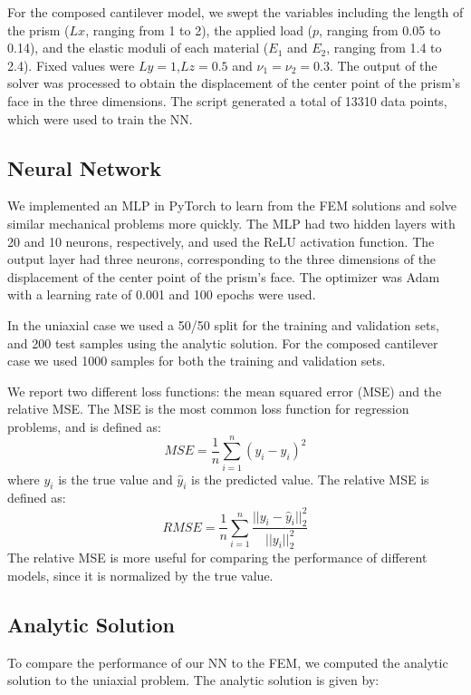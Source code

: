 \documentclass[oneside,a4paper,english,links]{amca}
\begin{document}
For the composed cantilever model, we swept the variables including the length of the prism ($Lx$, ranging from 1 to 2), the applied load ($p$, ranging from 0.05 to 0.14), and the elastic moduli of each material ($E_1$ and $E_2$, ranging from 1.4 to 2.4). Fixed values were $Ly=1$,$Lz=0.5$ and  $\nu_1=\nu_2=0.3$. The output of the solver was processed to obtain the displacement of the center point of the prism's face in the three dimensions. The script generated a total of 13310 data points, which were used to train the NN.

\subsection{Neural Network}
We implemented an MLP in PyTorch to learn from the FEM solutions and solve similar mechanical problems more quickly. The MLP had two hidden layers with 20 and 10 neurons, respectively, and used the ReLU activation function. The output layer had three neurons, corresponding to the three dimensions of the displacement of the center point of the prism's face. The optimizer was Adam with a learning rate of 0.001 and 100 epochs were used. 

In the uniaxial case we used a 50/50 split for the training and validation sets, and 200 test samples using the analytic solution. For the composed cantilever case we used 1000 samples for both the training and validation sets.

We report two different loss functions: the mean squared error (MSE) and the relative MSE. The MSE is the most common loss function for regression problems, and is defined as:
\begin{equation}
\label{eq:MSE}
MSE = \frac{1}{n} \sum_{i=1}^{n} (y_i - \hat{y}_i)^2
\end{equation}
where $y_i$ is the true value and $\hat{y}_i$ is the predicted value. The relative MSE is defined as:
\begin{equation}
\label{eq:RMSE}
RMSE = \frac{1}{n} \sum_{i=1}^{n} \frac{||y_i - \hat{y}_i||_2^2}{||y_i||_2^2}
\end{equation}
The relative MSE is more useful for comparing the performance of different models, since it is normalized by the true value.

\subsection{Analytic Solution}
To compare the performance of our NN to the FEM, we computed the analytic solution to the uniaxial problem. The analytic solution is given by:
\end{document}

